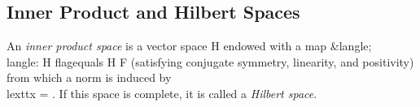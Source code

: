 \subsection{Inner Product and Hilbert Spaces} An \emph{inner product space} is a vector space H endowed with a map \langle &langle; \\langle: H \mathcal flag{equals} H \mathcal F (satisfying conjugate symmetry, linearity, and positivity) from which a norm is induced by \\lextt{x} = . If this space is complete, it is called a \emph{Hilbert space}.